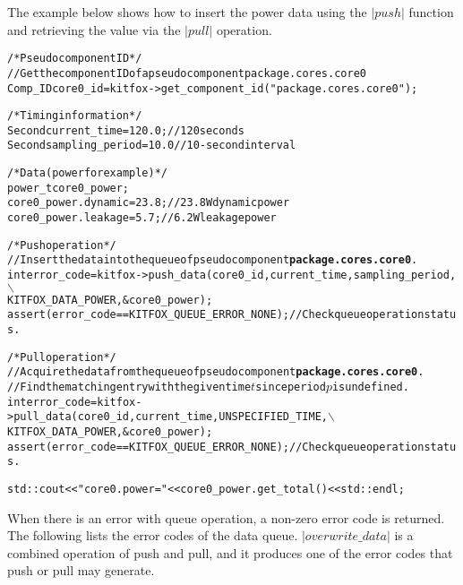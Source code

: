\noindent
The example below shows how to insert the power data using the $|push|$ function and retrieving the value via the $|pull|$ operation.
{
\fontsize{10pt}{11pt}\selectfont
\begin{alltt}
/* Pseudo component ID */
// Get the component ID of a pseudo component package.cores.core0
Comp_ID core0_id = kitfox->get_component_id("package.cores.core0");

/* Timing information */
Second current_time = 120.0; // 120 seconds
Second sampling_period = 10.0 // 10-second interval

/* Data (power for example) */
power_t core0_power;
core0_power.dynamic = 23.8; // 23.8W dynamic power
core0_power.leakage = 5.7; // 6.2W leakage power

/* Push operation */
// Insert the data into the queue of pseudo component{\bf package.cores.core0}.
int error_code = kitfox->push_data(core0_id, current_time, sampling_period,\(\backslash\)
                         KITFOX_DATA_POWER, &core0_power);
assert(error_code == KITFOX_QUEUE_ERROR_NONE); // Check queue operation status.

/* Pull operation */
// Acquire the data from the queue of pseudo component{\bf package.cores.core0}.
// Find the matching entry with the given time \(t\) since period \(p\) is undefined.
int error_code = kitfox->pull_data(core0_id, current_time, UNSPECIFIED_TIME,\(\backslash\)
                         KITFOX_DATA_POWER, &core0_power);
assert(error_code == KITFOX_QUEUE_ERROR_NONE); // Check queue operation status.

std::cout << "core0.power = " << core0_power.get_total() << std::endl;
\end{alltt}
}

\noindent
When there is an error with queue operation, a non-zero error code is returned. 
The following lists the error codes of the data queue. 
$|overwrite\_data|$ is a combined operation of push and pull, and it produces one of the error codes that push or pull may generate.

